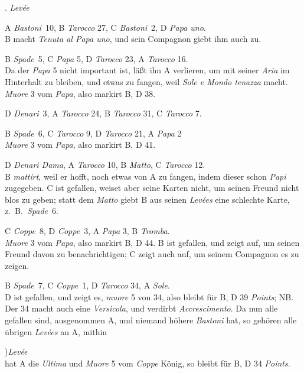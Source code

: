 \documentclass[11pt,a6paper,twoside]{article}
\newcounter{leveescnt}
\newenvironment{leveeslist}{
  \begin{list}
    {\arabic{leveescnt}. {\textit{Levée}}}
    {\usecounter{leveescnt}
      \setlength{\labelwidth}{2em}
      \setlength{\labelsep}{1em}
      \setlength{\itemsep}{0pt}
      \setlength{\parsep}{0pt}
      \setlength{\leftmargin}{1.5em}
      \setlength{\itemindent}{1em} %
    }
}{\end{list}}
\begin{document}
\begin{leveeslist}
\item A \textit{Bastoni}~10, B \textit{Tarocco} 27, C \textit{Bastoni}~2, D \textit{Papa uno}. \\B macht \textit{Tenuta al Papa uno}, und sein Compagnon giebt ihm auch zu.
\item B \textit{Spade}~5, C \textit{Papa} 5, D \textit{Tarocco} 23, A \textit{Tarocco} 16. \\Da der \textit{Papa} 5 nicht important ist, läßt ihn A verlieren, um mit seiner \textit{Aria} im Hinterhalt zu bleiben, und etwas zu fangen, weil \textit{Sole e Mondo tenazza} macht. \textit{Muore} 3 vom \textit{Papa}, also markirt B, D 38.
\item D \textit{Denari}~3, A \textit{Tarocco} 24, B \textit{Tarocco} 31, C \textit{Tarocco} 7.
\item B \textit{Spade}~6, C \textit{Tarocco} 9, D \textit{Tarocco} 21, A \textit{Papa} 2 \\\textit{Muore} 3 vom \textit{Papa}, also markirt B, D 41.
\item D \textit{Denari Dama}, A \textit{Tarocco} 10, B \textit{Matto}, C \textit{Tarocco} 12. \\B \textit{mattirt}, weil er hofft, noch etwas von A zu fangen, indem dieser schon \textit{Papi} zugegeben. C ist gefallen, weiset aber seine Karten nicht, um seinen Freund nicht blos zu geben; statt dem \textit{Matto} giebt B aus seinen \textit{Levées} eine schlechte Karte, z.\ B.\ \textit{Spade}~6.
\item C \textit{Coppe}~8, D \textit{Coppe}~3, A \textit{Papa} 3, B \textit{Tromba}. \\\textit{Muore} 3 vom \textit{Papa}, also markirt B, D 44. B ist gefallen, und zeigt auf, um seinen Freund davon zu benachrichtigen; C zeigt auch auf, um seinem Compagnon es zu zeigen.
\item B \textit{Spade}~7, C \textit{Coppe}~1, D \textit{Tarocco} 34, A \textit{Sole}. \\D ist gefallen, und zeigt es, \textit{muore} 5 von 34, also bleibt für B, D 39 \textit{Points}; NB. Der 34 macht auch eine \textit{Versicola}, und verdirbt \textit{Accrescimento}.
Da nun alle gefallen sind, ausgenommen A, und niemand höhere \textit{Bastoni} hat, so gehören alle übrigen \textit{Levées} an A, mithin
\item[\lower 16pt\hbox{\valign{&\hbox{\hsize=1em {#\vspace{4pt}}\hfil}\cr 19.& 20.& 21.\cr}}\Bigg)\textit{Levée}]\-\\ hat A die \textit{Ultima} und \textit{Muore} 5 vom \textit{\mbox{Coppe}} König, so bleibt für B, D 34 \textit{Points}.
\end{leveeslist}
\end{document}
